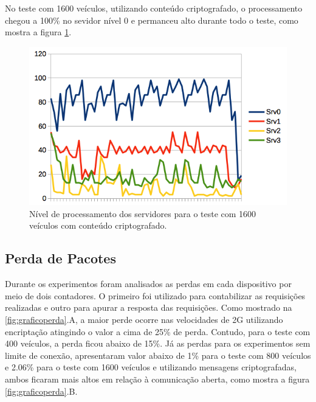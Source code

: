 \documentclass[
	12pt,				%
	oneside,			%
	a4paper,			%
	english,			%
	brazil				%
	]{abntex2ppgsi}
\begin{document}
No teste com 1600 veículos, utilizando conteúdo criptografado, o processamento chegou a 100\% no sevidor nível 0 e permanceu alto durante todo o teste, como mostra a figura \ref{fig:processamento1600}.
\begin{figure}[h!]
	\centering
	\includegraphics[width=0.7\columnwidth]{images/processamento2.png}
	\caption{Nível de processamento dos servidores para o teste com 1600 veículos com conteúdo criptografado.}
	\label{fig:processamento1600}
\end{figure}

\subsection{Perda de Pacotes}

Durante os experimentos foram analisados as perdas em cada dispositivo por meio de dois contadores. O primeiro foi utilizado para contabilizar as requisições realizadas  e outro para apurar a resposta das requisições. Como mostrado na \ref{fig:graficoperda}.A, a maior perde ocorre nas velocidades de 2G utilizando encriptação atingindo o valor a cima de 25\% de perda. Contudo, para o teste com 400 veículos, a perda ficou abaixo de 15\%. Já as perdas para os experimentos  sem limite de conexão, apresentaram valor abaixo de 1\% para o teste com 800 veículos e 2.06\% para o teste com 1600 veículos e utilizando mensagens criptografadas, ambos ficaram mais altos em relação à comunicação aberta, como mostra a figura \ref{fig:graficoperda}.B. 


\end{document}
